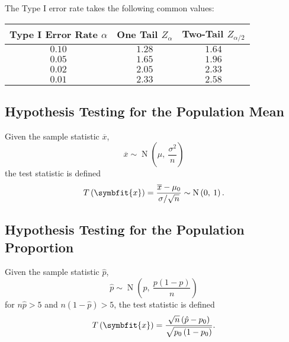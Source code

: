 \documentclass{article}
\begin{document}
The Type I error rate takes the following common values:
\begin{center}
    \begin{tabular}{ccc}
        \toprule
        \textbf{Type I Error Rate} \(\alpha\) & \textbf{One Tail} \(Z_{\alpha}\) & \textbf{Two-Tail} \(Z_{\alpha/2}\) \\
        \midrule
        \(0.10\)                              & \(1.28\)                         & \(1.64\)                           \\
        \(0.05\)                              & \(1.65\)                         & \(1.96\)                           \\
        \(0.02\)                              & \(2.05\)                         & \(2.33\)                           \\
        \(0.01\)                              & \(2.33\)                         & \(2.58\)                           \\
        \bottomrule
    \end{tabular}
\end{center}
\subsection{Hypothesis Testing for the Population Mean}
Given the sample statistic \(\overline{x}\),
\begin{equation*}
    \overline{x} \sim \operatorname{N}\left( \mu,\: \frac{\sigma^2}{n} \right)
\end{equation*}
the test statistic is defined
\begin{equation*}
    T\left( \symbfit{x} \right) = \frac{\overline{x} - \mu_0}{\sigma/\sqrt{n}} \sim \operatorname{N}\left( 0,\: 1 \right).
\end{equation*}
\subsection{Hypothesis Testing for the Population Proportion}
Given the sample statistic \(\hat{p}\),
\begin{equation*}
    \hat{p} \sim \operatorname{N}\left( p,\: \frac{p\left( 1 - p \right)}{n} \right)
\end{equation*}
for \(n \hat{p} > 5\) and \(n \left( 1 - \hat{p} \right) > 5\),
the test statistic is defined
\begin{equation*}
    T\left( \symbfit{x} \right) = \frac{\sqrt{n} \left( \hat{p} - p_0 \right)}{\sqrt{p_0 \left( 1 - p_0 \right)}}.
\end{equation*}
\end{document}
